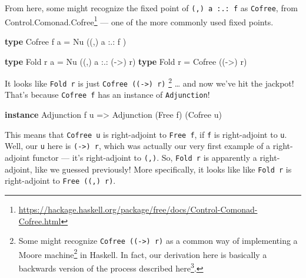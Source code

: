\documentclass[]{article}
\newenvironment{Shaded}{}{}
\newcommand{\DataTypeTok}[1]{\textcolor[rgb]{0.56,0.13,0.00}{#1}}
\newcommand{\KeywordTok}[1]{\textcolor[rgb]{0.00,0.44,0.13}{\textbf{#1}}}
\newcommand{\NormalTok}[1]{#1}
\newcommand{\OperatorTok}[1]{\textcolor[rgb]{0.40,0.40,0.40}{#1}}
\newcommand{\OtherTok}[1]{\textcolor[rgb]{0.00,0.44,0.13}{#1}}
\renewcommand{\href}[2]{#2\footnote{\url{#1}}}
\begin{document}
From here, some might recognize the fixed point of \texttt{(,)\ a\ :.:\ f} as
\texttt{Cofree}, from
\href{https://hackage.haskell.org/package/free/docs/Control-Comonad-Cofree.html}{Control.Comonad.Cofree}
--- one of the more commonly used fixed points.

\begin{Shaded}
\begin{Highlighting}[]
\KeywordTok{type} \DataTypeTok{Cofree}\NormalTok{ f a }\OtherTok{=} \DataTypeTok{Nu}\NormalTok{ ((,) a }\OperatorTok{:.:}\NormalTok{ f     )}

\KeywordTok{type} \DataTypeTok{Fold}\NormalTok{ r a   }\OtherTok{=} \DataTypeTok{Nu}\NormalTok{ ((,) a }\OperatorTok{:.:}\NormalTok{ (}\OtherTok{{-}>}\NormalTok{) r)}
\KeywordTok{type} \DataTypeTok{Fold}\NormalTok{ r     }\OtherTok{=} \DataTypeTok{Cofree}\NormalTok{ ((}\OtherTok{{-}>}\NormalTok{) r)}
\end{Highlighting}
\end{Shaded}

It looks like \texttt{Fold\ r} is just \texttt{Cofree\ ((-\textgreater{})\ r)}
\footnote{Some might recognize \texttt{Cofree\ ((-\textgreater{})\ r)} as a
  common way of implementing a
  \href{https://en.wikipedia.org/wiki/Moore_machine}{Moore machine} in Haskell.
  In fact, our derivation here is basically a backwards version of
  \href{https://www.schoolofhaskell.com/user/edwardk/moore/for-less}{the process
  described here}.} \ldots{} and now we've hit the jackpot! That's because
\texttt{Cofree\ f} has an instance of \texttt{Adjunction}!

\begin{Shaded}
\begin{Highlighting}[]
\KeywordTok{instance} \DataTypeTok{Adjunction}\NormalTok{ f u }\OtherTok{=>} \DataTypeTok{Adjunction}\NormalTok{ (}\DataTypeTok{Free}\NormalTok{ f) (}\DataTypeTok{Cofree}\NormalTok{ u)}
\end{Highlighting}
\end{Shaded}

This means that \texttt{Cofree\ u} is right-adjoint to \texttt{Free\ f}, if
\texttt{f} is right-adjoint to \texttt{u}. Well, our \texttt{u} here is
\texttt{(-\textgreater{})\ r}, which was actually our very first example of a
right-adjoint functor --- it's right-adjoint to \texttt{(,)}. So,
\texttt{Fold\ r} is apparently a right-adjoint, like we guessed previously! More
specifically, it looks like like \texttt{Fold\ r} is right-adjoint to
\texttt{Free\ ((,)\ r)}.
\end{document}
